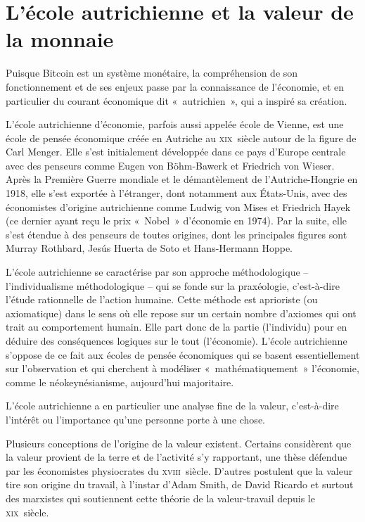 \section*{L'école autrichienne et la valeur de la monnaie}

Puisque Bitcoin est un système monétaire, la compréhension de son fonctionnement et de ses enjeux passe par la connaissance de l'économie, et en particulier du courant économique dit «~autrichien~», qui a inspiré sa création. 

L'école autrichienne d'économie, parfois aussi appelée école de Vienne, est une école de pensée économique créée en Autriche au \textsc{xix}\ieme{}~siècle autour de la figure de Carl Menger. Elle s'est initialement développée dans ce pays d'Europe centrale avec des penseurs comme Eugen von Böhm-Bawerk et Friedrich von Wieser. Après la Première Guerre mondiale et le démantèlement de l'Autriche-Hongrie en 1918, elle s'est exportée à l'étranger, dont notamment aux États-Unis, avec des économistes d'origine autrichienne comme Ludwig von Mises et Friedrich Hayek (ce dernier ayant reçu le prix «~Nobel~» d'économie en 1974). Par la suite, elle s'est étendue à des penseurs de toutes origines, dont les principales figures sont Murray Rothbard, Jesús Huerta de Soto et Hans-Hermann Hoppe.

L'école autrichienne se caractérise par son approche méthodologique -- l'individualisme méthodologique -- qui se fonde sur la praxéologie, c'est-à-dire l'étude rationnelle de l'action humaine. Cette méthode est aprioriste (ou axiomatique) dans le sens où elle repose sur un certain nombre d'axiomes qui ont trait au comportement humain. Elle part donc de la partie (l'individu) pour en déduire des conséquences logiques sur le tout (l'économie). L'école autrichienne s'oppose de ce fait aux écoles de pensée économiques qui se basent essentiellement sur l'observation et qui cherchent à modéliser «~mathématiquement~» l'économie, comme le néokeynésianisme, aujourd'hui majoritaire.


L'école autrichienne a en particulier une analyse fine de la valeur, c'est-à-dire l'intérêt ou l'importance qu'une personne porte à une chose.

Plusieurs conceptions de l'origine de la valeur existent. Certains considèrent que la valeur provient de la terre et de l'activité s'y rapportant, une thèse défendue par les économistes physiocrates du \textsc{xviii}\ieme{}~siècle. D'autres postulent que la valeur tire son origine du travail, à l'instar d'Adam Smith, de David Ricardo et surtout des marxistes qui soutiennent cette théorie de la valeur-travail depuis le \textsc{xix}\ieme{}~siècle.

